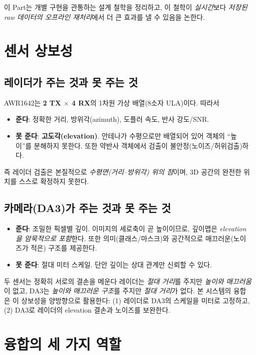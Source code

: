 이 Part는 개별 구현을 관통하는 설계 철학을 정리하고, 이 철학이 \emph{실시간}보다
\emph{저장된 raw 데이터의 오프라인 재처리}에서 더 큰 효과를 낼 수 있음을 논한다.

\chapter{센서 상보성}

\section{레이더가 주는 것과 못 주는 것}
AWR1642는 \textbf{2 TX $\times$ 4 RX}의 1차원 가상 배열(8소자 ULA)이다. 따라서
\begin{itemize}
  \item \textbf{준다}: 정확한 거리, 방위각(azimuth), 도플러 속도, 반사 강도/SNR.
  \item \textbf{못 준다}: \textbf{고도각(elevation)}. 안테나가 수평으로만 배열되어
        있어 객체의 ``높이''를 분해하지 못한다. 또한 약반사 객체에서 검출이
        불안정(노이즈/허위검출)하다.
\end{itemize}
즉 레이더 검출은 본질적으로 \emph{수평면(거리--방위각) 위의 점}이며, 3D 공간의
완전한 위치를 스스로 확정하지 못한다.

\section{카메라(DA3)가 주는 것과 못 주는 것}
\begin{itemize}
  \item \textbf{준다}: 조밀한 픽셀별 깊이. 이미지의 세로축이 곧 높이이므로,
        깊이맵은 \emph{elevation을 암묵적으로 포함}한다. 또한 의미(클래스/마스크)와
        공간적으로 매끄러운(노이즈가 적은) 구조를 제공한다.
  \item \textbf{못 준다}: 절대 미터 스케일. 단안 깊이는 상대 관계만 신뢰할 수 있다.
\end{itemize}

\begin{designbox}{두 센서는 정확히 서로의 결손을 메운다}
레이더는 \emph{절대 거리}를 주지만 \emph{높이와 매끄러움}이 없고, DA3는
\emph{높이와 매끄러운 구조}를 주지만 \emph{절대 거리}가 없다. 본 시스템의 융합은
이 상보성을 양방향으로 활용한다: (1) 레이더로 DA3의 스케일을 미터로 고정하고,
(2) DA3로 레이더의 elevation 결손과 노이즈를 보완한다.
\end{designbox}

\chapter{융합의 세 가지 역할}

